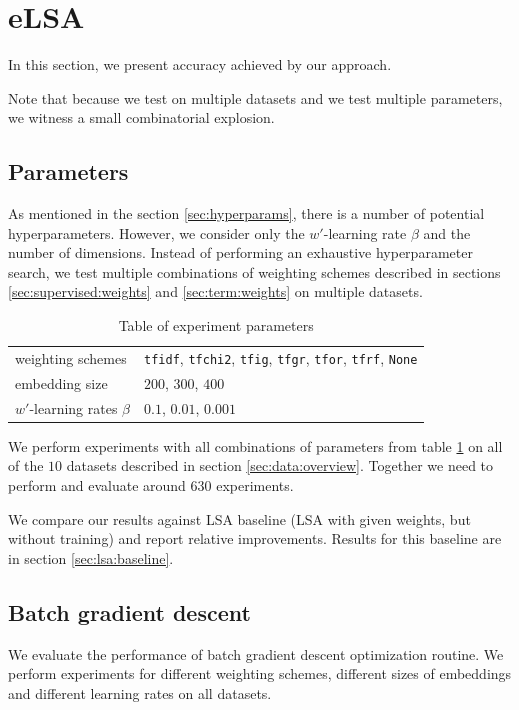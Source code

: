 \section{eLSA}
    
    In this section, we present accuracy achieved by our approach.
    
    Note that because we test on multiple datasets and we test multiple parameters, we witness a small combinatorial explosion.

    \subsection{Parameters}
    
    As mentioned in the section \ref{sec:hyperparams}, there is a number of potential hyperparameters. 
    However, we consider only the $w'$-learning rate $\beta$ and the number of dimensions.
    Instead of performing an exhaustive hyperparameter search, we test multiple combinations of weighting schemes described in sections \ref{sec:supervised:weights} and \ref{sec:term:weights} on multiple datasets. 

    \begin{table}[H]
\begin{center}
\begin{tabular}{l|l}
\toprule
\midrule
weighting schemes & \texttt{tfidf}, \texttt{tfchi2}, \texttt{tfig}, \texttt{tfgr}, \texttt{tfor}, \texttt{tfrf}, \texttt{None} \\
embedding size & $200$, $300$, $400$ \\
$w'$-learning rates $\beta$ & $0.1$, $0.01$, $0.001$\\
\bottomrule
\end{tabular}
\caption[Table of experiment parameters]{Table of experiment parameters}
\label{tab:exp:params}
\end{center}
\end{table}
    
    We perform experiments with all combinations of parameters from table \ref{tab:exp:params} on all of the $10$ datasets described in section \ref{sec:data:overview}.
    Together we need to perform and evaluate around $630$ experiments.
    
    We compare our results against LSA baseline (LSA with given weights, but without training) and report relative improvements.
    Results for this baseline are in section \ref{sec:lsa:baseline}.
    
    \subsection{Batch gradient descent}
    We evaluate the performance of batch gradient descent optimization routine.
    We perform experiments for different weighting schemes, different sizes of embeddings and different learning rates on all datasets.

